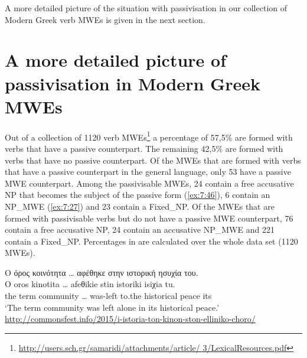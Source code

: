 \documentclass[output=paper]{langsci/langscibook}
\begin{document}
A more detailed picture of the situation with passivisation in our collection of Modern Greek verb MWEs is given in the next section.

\section{A more detailed picture of passivisation in Modern Greek MWEs}
\label{sec:mark:4}


Out of a collection of 1120 verb MWEs\footnote{\url{http://users.sch.gr/samaridi/attachments/article/
3/LexicalResources.pdf}} a percentage of   57,5\%  are formed with verbs that have a passive counterpart. The remaining 42,5\%  are formed with verbs that have no  passive counterpart. Of the MWEs that are formed with verbs that have a passive counterpart in the general language, only 53 have a passive MWE counterpart. Among the passivisable MWEs, 24 contain a free accusative NP that becomes the subject of the passive form (\ref{ex:7:46}), 6 contain an NP\_MWE (\ref{ex:7:27}) and 23 contain a Fixed\_NP. Of the MWEs that are formed with passivisable verbs but do not have a passive MWE counterpart, 76 contain a free accusative NP, 24 contain an accusative NP\_MWE and 221 contain a Fixed\_NP. Percentages in  are calculated over the whole data set (1120 MWEs).

\begin{exe}
\ex \label{ex:7:46}
\glll Ο όρος κοινότητα  \ldots{} αφέθηκε στην ιστορική ησυχία του.\\
O oros kinotita \ldots{} afeθikie stin istoriki isiχia tu.\\
     the term community \ldots{}  was-left to.the historical peace its\\
\glt `The term community was left alone in its historical peace.'\\
\url{http://commonsfest.info/2015/i-istoria-ton-kinon-ston-elliniko-choro/} 
\end{exe}
\end{document}
